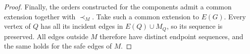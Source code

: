 \documentclass[10pt,a4paper]{amsart}
\begin{document}
\begin{proof}
    Finally, the orders constructed for the components admit a common extension together with $\prec_M$. Take such a common extension to $E(G)$. Every vertex of $Q$ has all its incident edges in $E(Q)\cup M_Q$, so its sequence is preserved. All edges outside $M$ therefore have distinct endpoint sequences, and the same holds for the safe edges of $M$.
\end{proof}
\end{document}
